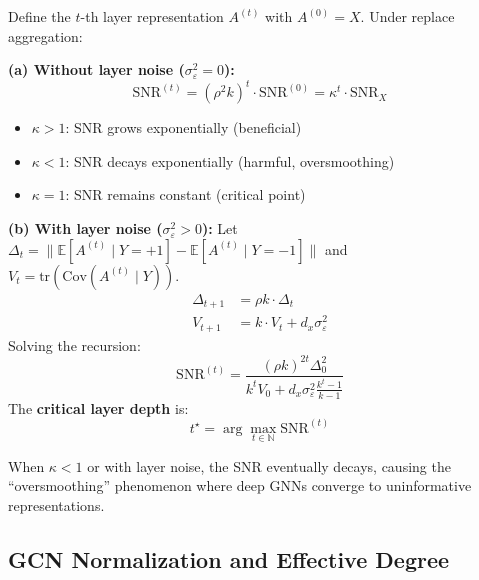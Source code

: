 \begin{theorem}
\label{thm:multilayer}
Define the $t$-th layer representation $A^{(t)}$ with $A^{(0)} = X$. Under replace aggregation:

\textbf{(a) Without layer noise ($\sigma_\varepsilon^2 = 0$):}
\begin{equation}
    \mathrm{SNR}^{(t)} = (\rho^2 k)^t \cdot \mathrm{SNR}^{(0)} = \kappa^t \cdot \mathrm{SNR}_X
\end{equation}
\begin{itemize}
    \item $\kappa > 1$: SNR grows exponentially (beneficial)
    \item $\kappa < 1$: SNR decays exponentially (harmful, oversmoothing)
    \item $\kappa = 1$: SNR remains constant (critical point)
\end{itemize}

\textbf{(b) With layer noise ($\sigma_\varepsilon^2 > 0$):}
Let $\Delta_t = \|\mathbb{E}[A^{(t)} \mid Y=+1] - \mathbb{E}[A^{(t)} \mid Y=-1]\|$ and $V_t = \mathrm{tr}(\mathrm{Cov}(A^{(t)} \mid Y))$.
\begin{align}
    \Delta_{t+1} &= \rho k \cdot \Delta_t \\
    V_{t+1} &= k \cdot V_t + d_x \sigma_\varepsilon^2
\end{align}
Solving the recursion:
\begin{equation}
    \mathrm{SNR}^{(t)} = \frac{(\rho k)^{2t} \Delta_0^2}{k^t V_0 + d_x \sigma_\varepsilon^2 \frac{k^t - 1}{k - 1}}
\end{equation}
The \textbf{critical layer depth} is:
\begin{equation}
    t^\star = \arg\max_{t \in \mathbb{N}} \mathrm{SNR}^{(t)}
\end{equation}
\end{theorem}

\begin{remark}
When $\kappa < 1$ or with layer noise, the SNR eventually decays, causing the ``oversmoothing'' phenomenon where deep GNNs converge to uninformative representations.
\end{remark}

\subsection{GCN Normalization and Effective Degree}
\label{subsec:gcn}

